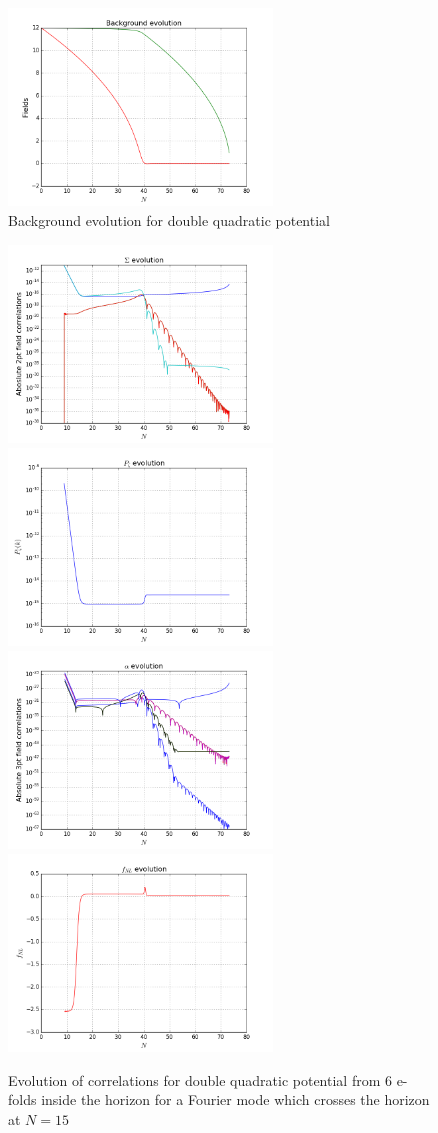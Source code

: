 \documentclass[10pt,
amsmath,amssymb,
aps,prd,nofootinbib,eqsecnum,a4paper]{revtex4}
\begin{document}
\begin{figure}[H]
\centering
\includegraphics[width=7cm]{DQ1}
\caption{\label{double1}
Background evolution for double quadratic potential}\label{shot3}
\end{figure}
\begin{figure}[H]
\centering
\includegraphics[width=7cm]{DQ2}\includegraphics[width=7cm]{DQ3}\
\includegraphics[width=7cm]{DQ4}\includegraphics[width=7cm]{DQ5}\
\caption{\label{double2}
Evolution of correlations for double quadratic potential from $6$ e-folds inside the 
horizon for a Fourier mode
which crosses the horizon at $N=15$}\label{shot3}
\end{figure}
\end{document}
